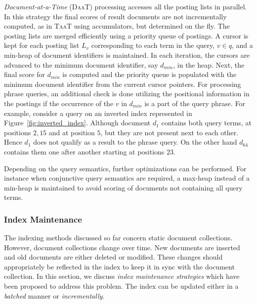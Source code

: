 \emph{Document-at-a-Time} (\textsc{DaaT}) processing accesses all the posting lists in parallel. In this strategy the final scores of result documents are not incrementally computed, as in \textsc{TaaT} using accumulators, but determined on the fly. The posting lists are merged efficiently using a priority queue of postings. A cursor is kept for  each posting list $L_v$ corresponding to each term in the query, $v \in q$, and a min-heap of document identifiers is maintained. In each iteration, the cursors are advanced to the minimum document identifier, say $d_{min}$, in the heap. Next, the final score for $d_{min}$ is computed and the priority queue is populated with the minimum document identifier from the current cursor pointers. For processing phrase queries, an additional check is done utilizing the positional information in the postings if the occurrence of the $v$ in $d_{min}$ is a part of the query phrase. For example, consider a query  on an inverted index represented in Figure~\ref{fig:inverted_index}. Although document $d_1$ contains both query terms,  at positions $2, 15$ and  at position $5$, but they are not present next to each other. Hence $d_1$ does not qualify as a result to the phrase query. On the other hand $d_{64}$ contains them one after another starting at positions $23$.

Depending on the query semantics, further optimizations can be performed. For instance when conjunctive query semantics are required, a max-heap instead of a min-heap is maintained to avoid scoring of documents not containing all query terms.

\subsubsection{Index Maintenance}

The indexing methods discussed so far concern static document collections. However, document collections change over time. New documents are inserted and old documents are either deleted or modified. These changes should appropriately be reflected in the index to keep it in sync with the document collection. In this section, we discuss \emph{index maintenance strategies} which have been proposed to address this problem. The index can be updated either in a \emph{batched} manner or \emph{incrementally}.

